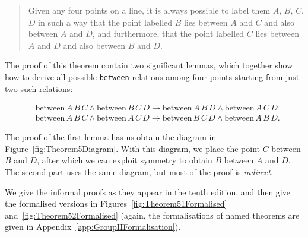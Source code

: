 \documentclass{article}
\newcommand{\between}[3]{\text{between}\,#1\,#2\,#3}
\renewcommand{\implies}{\longrightarrow}
\begin{document}
\begin{quote}
Given any four points on a line, it is always possible to label them $A$, $B$, $C$, $D$ in such a way that the point labelled $B$ lies between $A$ and $C$ and also between $A$ and $D$, and furthermore, that the point labelled $C$ lies between $A$ and $D$ and also between $B$ and $D$.
\end{quote}

The proof of this theorem contain two significant lemmas, which together show how to derive all possible \texttt{between} relations among four points starting from just two such relations:

\begin{align}
&\between{A}{B}{C} \wedge \between{B}{C}{D} \implies \between{A}{B}{D} \wedge \between{A}{C}{D}\label{eq:five1}\\
&\between{A}{B}{C} \wedge \between{A}{C}{D} \implies \between{B}{C}{D} \wedge \between{A}{B}{D}\label{eq:five2}.
\end{align}

The proof of the first lemma has us obtain the diagram in Figure~\ref{fig:Theorem5Diagram}. With this diagram, we place the point $C$ between $B$ and $D$, after which we can exploit symmetry to obtain $B$ between $A$ and $D$. The second part uses the same diagram, but most of the proof is \emph{indirect}. 

We give the informal proofs as they appear in the tenth edition, and then give the formalised versions in Figures~\ref{fig:Theorem51Formalised} and~\ref{fig:Theorem52Formalised} (again, the formalisations of named theorems are given in Appendix~\ref{app:GroupIIFormalisation}).
\end{document}
